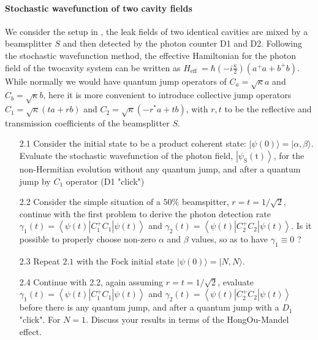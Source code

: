 \documentclass[hyperref, a4paper]{article}
\begin{document}
\paragraph{Stochastic wavefunction of two cavity fields} We consider the setup in , the leak fields of two identical cavities are mixed by a beamsplitter $S$ and then detected by the photon counter D1 and D2. Following the stochastic wavefunction method, the effective Hamiltonian for the photon field of the twocavity system can be written as $H_{\text {eff }}=\hbar\left(-i \frac{\kappa}{2}\right)\left(a^{+} a+b^{+} b\right)$. While normally we would have quantum jump operators of $C_{a}=\sqrt{\kappa} a$ and $C_{b}=\sqrt{\kappa} b$, here it is more convenient to introduce collective jump operators $C_{1}=\sqrt{\kappa}(t a+r b)$ and $C_{2}=\sqrt{\kappa}\left(-r^{*} a+t b\right)$, with $r, t$ to be the reflective and transmission coefficients of the beamsplitter $S$.

\begin{itemize}
    \item[2.1] Consider the initial state to be a product coherent state: $|\psi(0)\rangle=|\alpha, \beta\rangle$.
    Evaluate the stochastic wavefunction of the photon field, $\left|\psi_{\mathrm{S}}(\mathrm{t})\right\rangle$, for the non-Hermitian evolution without any quantum jump, and after a quantum jump by $C_{1}$ operator (D1 "click")
    \item[2.2] Consider the simple situation of a $50 \%$ beamspitter, $r=t=1 / \sqrt{2}$, continue with the first problem to derive the photon detection rate $\gamma_{1}(t)=\left\langle\psi(t)\left|C_{1}^{+} C_{1}\right| \psi(t)\right\rangle$ and $\gamma_{2}(t)=\left\langle\psi(t)\left|C_{2}^{+} C_{2}\right| \psi(t)\right\rangle$. Is it possible to properly choose non-zero $\alpha$ and $\beta$ values, so as to have $\gamma_{1} \equiv 0$ ?
    \item[2.3] Repeat $2.1$ with the Fock initial state $|\psi(0)\rangle=|N, N\rangle$.
    \item[2.4] Continue with 2.2, again assuming $r=t=1 / \sqrt{2}$, evaluate $\gamma_{1}(t)=\left\langle\psi(t)\left|C_{1}^{+} C_{1}\right| \psi(t)\right\rangle$ and $\gamma_{2}(t)=\left\langle\psi(t)\left|C_{2}^{+} C_{2}\right| \psi(t)\right\rangle$ before there is any quantum jump, and after a quantum jump with a $D_{1}$ "click". For $N=1$. Discuss your results in terms of the HongOu-Mandel effect.
\end{itemize}
\end{document}
